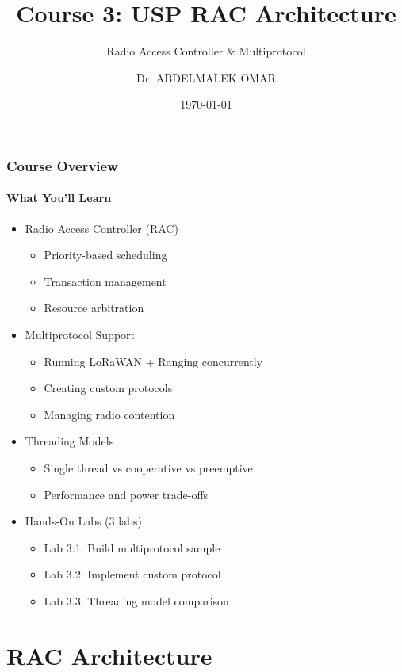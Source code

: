 \documentclass{beamer}
\title{Course 3: USP RAC Architecture}
\subtitle{Radio Access Controller \& Multiprotocol}
\author{Dr. ABDELMALEK OMAR}
\date{\today}
\institute{USP Zephyr Training Series\\Copyright \copyright{} 2025 Dr. ABDELMALEK OMAR}
\begin{document}
\begin{frame}[plain,t]
\titlepage
\end{frame}

\begin{frame}
\frametitle{Course Overview}
\framesubtitle{What You'll Learn}
\begin{itemize}
    \item Radio Access Controller (RAC)
    \begin{itemize}
        \item Priority-based scheduling
        \item Transaction management
        \item Resource arbitration
    \end{itemize}
    \item Multiprotocol Support
    \begin{itemize}
        \item Running LoRaWAN + Ranging concurrently
        \item Creating custom protocols
        \item Managing radio contention
    \end{itemize}
    \item Threading Models
    \begin{itemize}
        \item Single thread vs cooperative vs preemptive
        \item Performance and power trade-offs
    \end{itemize}
    \item Hands-On Labs (3 labs)
    \begin{itemize}
        \item Lab 3.1: Build multiprotocol sample
        \item Lab 3.2: Implement custom protocol
        \item Lab 3.3: Threading model comparison
    \end{itemize}
\end{itemize}
\end{frame}

\section{RAC Architecture}
\end{document}
